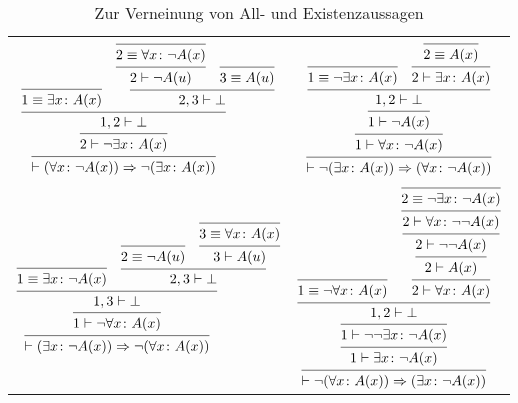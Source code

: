 \begin{table}
\begin{center}
\caption{Zur Verneinung von All- und Existenzaussagen}%
\label{tab:Negation-All-Ex}
\begin{tabular}{@{}cc@{}}
\toprule
$\begin{prooftree}[center = false, separation = 1em]
      \infer0{1\equiv\exists x\colon A(x)}
          \infer0{2\equiv\forall x\colon\lnot A(x)}
        \infer1{2\vdash\lnot A(u)}
        \infer0{3\equiv A(u)}
      \infer2{2,3\vdash \bot}
    \infer2{1,2\vdash\bot}
  \infer1{2\vdash\lnot\exists x\colon A(x)}
\infer1{\vdash (\forall x\colon\lnot A(x))\cond \lnot (\exists x\colon A(x))}
\end{prooftree}$
&
$\begin{prooftree}[center = false, separation = 1em]
        \infer0{1\equiv\lnot\exists x\colon A(x)}
          \infer0{2\equiv A(x)}
        \infer1{2\vdash\exists x\colon A(x)}
      \infer2{1, 2\vdash\bot}
    \infer1{1\vdash\lnot A(x)}
  \infer1{1\vdash\forall x\colon\lnot A(x)}
\infer1{\vdash \lnot (\exists x\colon A(x))\cond (\forall x\colon\lnot A(x))}
\end{prooftree}$\\[10pt]
$\begin{prooftree}[center = false, separation = 1em]
      \infer0{1\equiv\exists x\colon \lnot A(x)}
        \infer0{2\equiv\lnot A(u)}
          \infer0{3\equiv\forall x\colon A(x)}
        \infer1{3\vdash A(u)}
      \infer2{2, 3\vdash\bot}
    \infer2{1, 3\vdash\bot}
  \infer1{1\vdash\lnot\forall x\colon A(x)}
\infer1{\vdash (\exists x\colon\lnot A(x))\cond \lnot (\forall x\colon A(x))}
\end{prooftree}$
&
$\begin{prooftree}[center = false, separation = 1em]
        \infer0{1\equiv\lnot\forall x\colon A(x)}
                \infer0{2\equiv\lnot\exists x\colon\lnot A(x)}
              \infer1{2\vdash\forall x\colon\lnot\lnot A(x)}
            \infer1{2\vdash\lnot\lnot A(x)}
          \infer1{2\vdash A(x)}
        \infer1{2 \vdash\forall x\colon A(x)}
      \infer2{1,2\vdash\bot}
    \infer1{1\vdash\lnot\lnot\exists x\colon\lnot A(x)}
  \infer1{1\vdash\exists x\colon\lnot A(x)}
\infer1{\vdash \lnot (\forall x\colon A(x))\cond (\exists x\colon\lnot A(x))}
\end{prooftree}$\\
\bottomrule
\end{tabular}
\end{center}
\end{table}

